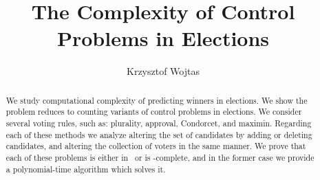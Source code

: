 \documentclass[man,bazy,a4paper,11pt,sfheadings,noindentfirst]{mgrwms}
\begin{document}
\title{The Complexity of Control Problems in Elections}
\author{Krzysztof Wojtas}

\maketitle

\renewcommand{\cfttoctitlefont}{\LARGE\sffamily\bfseries}
\renewcommand{\cftchapfont}{\sffamily\bfseries}
\renewcommand{\cftchappagefont}{\sffamily\bfseries}
\renewcommand{\cftsecfont}{\sffamily}
\renewcommand{\cftsecleader}{\sffamily\cftdotfill{\cftsecdotsep}}
\renewcommand{\cftsecpagefont}{\sffamily}
\setlength{\cftbeforechapskip}{3.75mm}

\tableofcontents

\begin{abstract}
	We study computational complexity of predicting winners in elections.
	We show the problem reduces to counting variants of control problems in elections.
	We consider several voting rules, such as: plurality, approval, Condorcet, and maximin.
	Regarding each of these methods we analyze altering the set of candidates by adding or deleting candidates, and altering the collection of voters in the same manner.
	We prove that each of these problems is either in \FPclass\ or is \sharpPclass-complete, and in the former case we provide a polynomial-time algorithm which solves it.
\end{abstract}

\vskip1in











\nocite{*}
\end{document}
